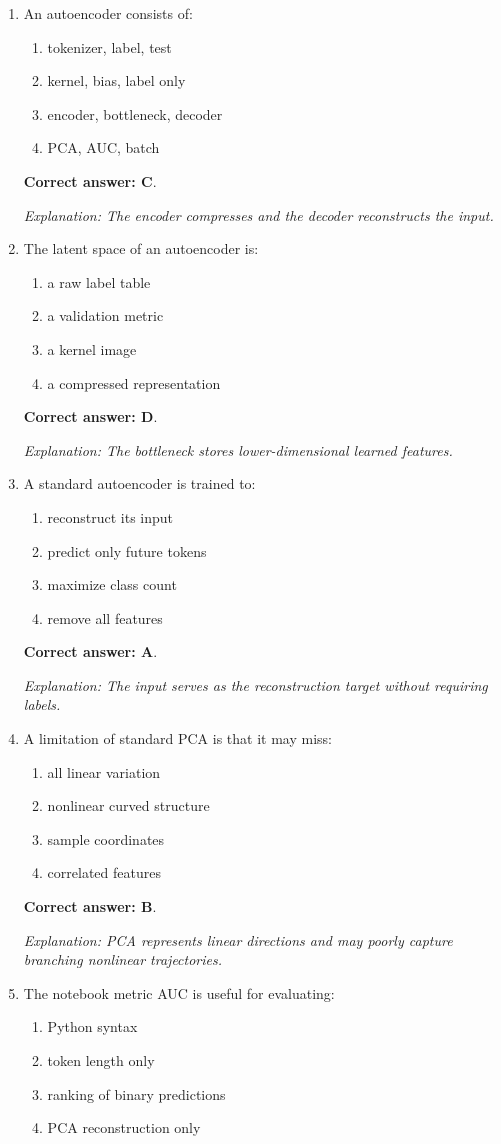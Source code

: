 \documentclass[10pt,a4paper]{article}
\newcommand{\ans}[1]{\par\textbf{Correct answer: #1}}
\newcommand{\expn}[1]{\par\textit{Explanation: #1}}
\begin{document}
\begin{enumerate}[label=\textbf{\arabic*.},itemsep=4pt]
\ans{B}. \expn{Projection onto PCs gives low-dimensional sample coordinates.}
\item An autoencoder consists of:
\begin{enumerate}[label=\Alph*.,itemsep=0pt]\item tokenizer, label, test\item kernel, bias, label only\item encoder, bottleneck, decoder\item PCA, AUC, batch\end{enumerate}
\ans{C}. \expn{The encoder compresses and the decoder reconstructs the input.}
\item The latent space of an autoencoder is:
\begin{enumerate}[label=\Alph*.,itemsep=0pt]\item a raw label table\item a validation metric\item a kernel image\item a compressed representation\end{enumerate}
\ans{D}. \expn{The bottleneck stores lower-dimensional learned features.}
\item A standard autoencoder is trained to:
\begin{enumerate}[label=\Alph*.,itemsep=0pt]\item reconstruct its input\item predict only future tokens\item maximize class count\item remove all features\end{enumerate}
\ans{A}. \expn{The input serves as the reconstruction target without requiring labels.}
\item A limitation of standard PCA is that it may miss:
\begin{enumerate}[label=\Alph*.,itemsep=0pt]\item all linear variation\item nonlinear curved structure\item sample coordinates\item correlated features\end{enumerate}
\ans{B}. \expn{PCA represents linear directions and may poorly capture branching nonlinear trajectories.}
\item The notebook metric AUC is useful for evaluating:
\begin{enumerate}[label=\Alph*.,itemsep=0pt]\item Python syntax\item token length only\item ranking of binary predictions\item PCA reconstruction only\end{enumerate}

\end{enumerate}
\end{document}
